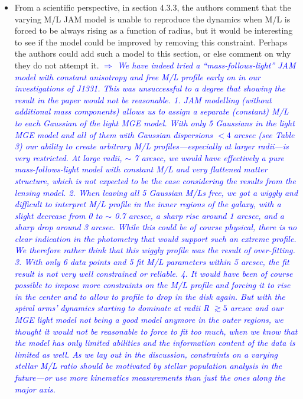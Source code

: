 \documentclass[10pt,a4paper]{article}
\newcommand{\Comment}[1]{\textsl{\textcolor{Blue}{$\Longrightarrow$ {#1}}}}
\begin{document}
\begin{itemize}
\item From a scientific perspective, in section 4.3.3, the authors comment that the
varying M/L JAM model is unable to reproduce the dynamics when M/L is forced to be
always rising as a function of radius, but it would be interesting to see if the
model could be improved by removing this constraint. Perhaps the authors could add
such a model to this section, or else comment on why they do not attempt it. \Comment{We have indeed tried a ``mass-follows-light'' JAM model with constant anisotropy and free M/L profile early on in our investigations of J1331. This was unsuccessful to a degree that showing the result in the paper would not be reasonable. 1. JAM modelling (without additional mass components) allows us to assign a separate (constant) M/L to each Gaussian of the light MGE model. With only 5 Gaussians in the light MGE model and all of them with Gaussian dispersions $< 4$ arcsec (see Table 3) our ability to create arbitrary M/L profiles---especially at larger radii---is very restricted. At large radii, $\sim$ 7 arcsec, we would have effectively a pure mass-follows-light model with constant M/L and very flattened matter structure, which is not expected to be the case considering the results from the lensing model. 2. When leaving all 5 Gaussian M/Ls free, we got a wiggly and difficult to interpret M/L profile in the inner regions of the galaxy, with a slight decrease from 0 to $\sim$ 0.7 arcsec, a sharp rise around 1 arcsec, and a sharp drop around 3 arcsec. While this could be of course physical, there is no clear indication in the photometry that would support such an extreme profile. We therefore rather think that this wiggly profile was the result of over-fitting. 3. With only 6 data points and 5 fit M/L parameters within 5 arcsec, the fit result is not very well constrained or reliable. 4. It would have been of course possible to impose more constraints on the M/L profile and forcing it to rise in the center and to allow to profile to drop in the disk again. But with the spiral arms' dynamics starting to dominate at radii R $\gtrsim 5$ arcsec and our MGE light model not being a good model anymore in the outer regions, we thought it would not be reasonable to force to fit too much, when we know that the model has only limited abilities and the information content of the data is limited as well. As we lay out in the discussion, constraints on a varying stellar M/L ratio should be motivated by stellar population analysis in the future---or use more kinematics measurements than just the ones along the major axis. }


\end{itemize}
\end{document}
